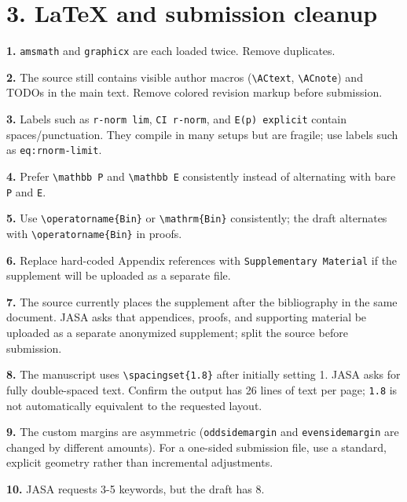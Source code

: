\documentclass[10pt,a4paper]{article}
\begin{document}
\section*{3. LaTeX and submission cleanup}

\par\medskip\noindent\textbf{1.} \texttt{amsmath} and \texttt{graphicx} are each loaded twice. Remove duplicates.
\par\medskip\noindent\textbf{2.} The source still contains visible author macros (\texttt{\textbackslash{}\allowbreak{}ACtext}, \texttt{\textbackslash{}\allowbreak{}ACnote}) and TODOs in the main text. Remove colored revision markup before submission.
\par\medskip\noindent\textbf{3.} Labels such as \texttt{r-norm lim}, \texttt{CI r-norm}, and \texttt{E(p) explicit} contain spaces/punctuation. They compile in many setups but are fragile; use labels such as \texttt{eq:rnorm-limit}.
\par\medskip\noindent\textbf{4.} Prefer \texttt{\textbackslash{}\allowbreak{}mathbb P} and \texttt{\textbackslash{}\allowbreak{}mathbb E} consistently instead of alternating with bare \texttt{P} and \texttt{E}.
\par\medskip\noindent\textbf{5.} Use \texttt{\textbackslash{}\allowbreak{}operatorname\{\allowbreak{}Bin\}\allowbreak{}} or \texttt{\textbackslash{}\allowbreak{}mathrm\{\allowbreak{}Bin\}\allowbreak{}} consistently; the draft alternates with \texttt{\textbackslash{}\allowbreak{}operatorname\{\allowbreak{}Bin\}\allowbreak{}} in proofs.
\par\medskip\noindent\textbf{6.} Replace hard-coded Appendix references with \texttt{Supplementary Material} if the supplement will be uploaded as a separate file.
\par\medskip\noindent\textbf{7.} The source currently places the supplement after the bibliography in the same document. JASA asks that appendices, proofs, and supporting material be uploaded as a separate anonymized supplement; split the source before submission.
\par\medskip\noindent\textbf{8.} The manuscript uses \texttt{\textbackslash{}\allowbreak{}spacingset\{\allowbreak{}1.8\}\allowbreak{}} after initially setting 1. JASA asks for fully double-spaced text. Confirm the output has 26 lines of text per page; \texttt{1.8} is not automatically equivalent to the requested layout.
\par\medskip\noindent\textbf{9.} The custom margins are asymmetric (\texttt{oddsidemargin} and \texttt{evensidemargin} are changed by different amounts). For a one-sided submission file, use a standard, explicit geometry rather than incremental adjustments.
\par\medskip\noindent\textbf{10.} JASA requests 3-5 keywords, but the draft has 8.
\end{document}
